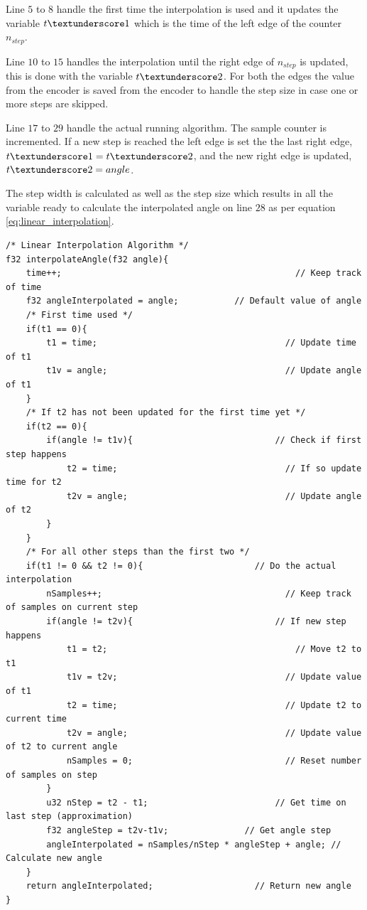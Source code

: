 Line $5$ to $8$ handle the first time the interpolation is used and it updates the variable $t\textunderscore 1$ which is the time of the left edge of the counter $n_{step}$. 

Line $10$ to $15$ handles the interpolation until the right edge of $n_{step}$ is updated, this is done with the variable $t\textunderscore 2$. For both the edges the value from the encoder is saved from the encoder to handle the step size in case one or more steps are skipped.

Line $17$ to $29$ handle the actual running algorithm. The sample counter is incremented. If a new step is reached the left edge is set the the last right edge, $t\textunderscore 1 = t\textunderscore 2$, and the new right edge is updated, $t\textunderscore 2 = angle$.

The step width is calculated as well as the step size which results in all the variable ready to calculate the interpolated angle on line $28$ as per equation \ref{eq:linear_interpolation}.
\newpage

\begin{lstlisting}[style=c, caption=Interpolation algorithm implemented on the embedded system., label=code:interpolation_algorithm]
/* Linear Interpolation Algorithm */
f32 interpolateAngle(f32 angle){
	time++;								                 // Keep track of time
	f32 angleInterpolated = angle;		     // Default value of angle
	/* First time used */
	if(t1 == 0){
		t1 = time;						               // Update time of t1
		t1v = angle;					               // Update angle of t1
	}
	/* If t2 has not been updated for the first time yet */
	if(t2 == 0){
		if(angle != t1v){				             // Check if first step happens
			t2 = time;					               // If so update time for t2
			t2v = angle;				               // Update angle of t2
		}
	}
	/* For all other steps than the first two */
	if(t1 != 0 && t2 != 0){				         // Do the actual interpolation
		nSamples++;						               // Keep track of samples on current step
		if(angle != t2v){				             // If new step happens
			t1 = t2;					                 // Move t2 to t1
			t1v = t2v;					               // Update value of t1
			t2 = time;					               // Update t2 to current time
			t2v = angle;				               // Update value of t2 to current angle
			nSamples = 0;				               // Reset number of samples on step
		}
 		u32 nStep = t2 - t1;				         // Get time on last step (approximation)
		f32 angleStep = t2v-t1v;	           // Get angle step
		angleInterpolated = nSamples/nStep * angleStep + angle; // Calculate new angle
	}
	return angleInterpolated;			         // Return new angle
}
\end{lstlisting}

